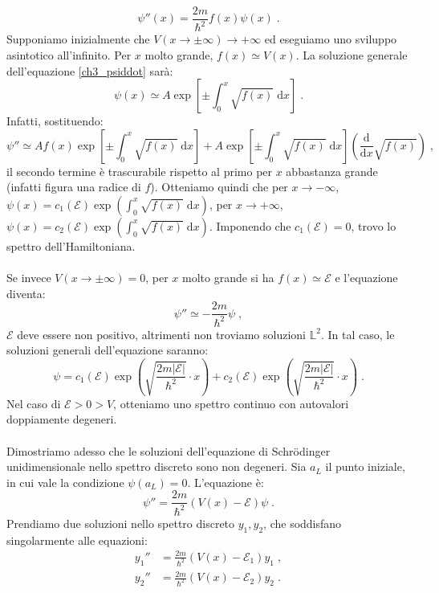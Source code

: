\documentclass[12pt,a4paper]{report}
\theoremstyle{definition}
\numberwithin{equation}{section}
\newcommand{\diff}[1][]{\mathrm{d}#1}
\begin{document}
\begin{equation}
\psi''(x)=\frac{2m}{\hbar^2}f(x)\psi(x)\;. \label{ch3_psiddot}
\end{equation}
Supponiamo inizialmente che $V(x\to\pm\infty)\to +\infty$ ed eseguiamo uno sviluppo asintotico all'infinito. Per $x$ molto grande, $f(x)\simeq V(x)$. La soluzione generale dell'equazione \eqref{ch3_psiddot} sarà:
\begin{equation}
\psi(x)\simeq A\exp\left[\pm\int_{0}^{x}\sqrt{f(x)}\;\diff{x}\right]\;.
\end{equation}
Infatti, sostituendo:
$$
\psi''\simeq Af(x)\exp\left[\pm\int_{0}^{x} \sqrt{f(x)}\;\diff{x}\right]+ A\exp\left[\pm\int_{0}^{x} \sqrt{f(x)}\;\diff{x}\right]\left(\frac{\mathrm{d}}{\diff{x}}\sqrt{f(x)}\right)\;,
$$
il secondo termine è trascurabile rispetto al primo per $x$ abbastanza grande (infatti figura una radice di $f$). Otteniamo quindi che per $x\to -\infty$, $\psi(x)=c_1(\mathcal{E})\exp\left(\int_0^x \sqrt{f(x)}\;\diff{x}\right)$, per $x\to +\infty$, $\psi(x)=c_2(\mathcal{E})\exp\left(\int_0^x \sqrt{f(x)}\;\diff{x}\right)$. Imponendo che $c_1(\mathcal{E})=0$, trovo lo spettro dell'Hamiltoniana. \\
\\
Se invece $V(x\to\pm\infty)=0$, per $x$ molto grande si ha $f(x)\simeq \mathcal{E}$ e l'equazione diventa:
$$
\psi''\simeq -\frac{2m}{\hbar^2}\psi\;,
$$
$\mathcal{E}$ deve essere non positivo, altrimenti non troviamo soluzioni $\mathbb{L}^2$. In tal caso, le soluzioni generali dell'equazione saranno:
\begin{equation}
\psi=c_1(\mathcal{E})\exp\left(\sqrt{\frac{2m|\mathcal{E}|}{\hbar^2}}\cdot x\right)+c_2(\mathcal{E})\exp\left(\sqrt{\frac{2m|\mathcal{E}|}{\hbar^2}}\cdot x\right)\;.
\end{equation}
Nel caso di $\mathcal{E}>0>V$, otteniamo uno spettro continuo con autovalori doppiamente degeneri. \\
\\
Dimostriamo adesso che le soluzioni dell'equazione di Schrödinger unidimensionale nello spettro discreto sono non degeneri. Sia $a_L$ il punto iniziale, in cui vale la condizione $\psi(a_L)=0$. L'equazione è:
$$
\psi''=\frac{2m}{\hbar^2}(V(x)-\mathcal{E})\psi\;.
$$
Prendiamo due soluzioni nello spettro discreto $y_1,y_2$, che soddisfano singolarmente alle equazioni:
\begin{align*}
y_1'' &= \frac{2m}{\hbar^2}(V(x)-\mathcal{E}_1)y_1\;, \\
y_2'' &= \frac{2m}{\hbar^2}(V(x)-\mathcal{E}_2)y_2\;.
\end{align*}
\end{document}
